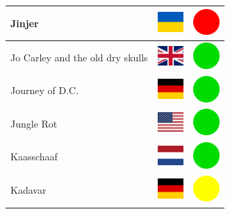 \documentclass[12pt, a4paper, twoside]{report}
\begin{document}
\begin{center}
\begin{longtable}{|p{5cm}|p{2cm}|p{2cm}|}
 Jinjer                                                     & \includegraphics[width=1cm]{../4x3/ua} &   \includegraphics[width=1cm]{../likes/n} \\ \hline
 Jo Carley and the old dry skulls                           & \includegraphics[width=1cm]{../4x3/gb} &   \includegraphics[width=1cm]{../likes/y} \\ \hline
 Journey of D.C.                                            & \includegraphics[width=1cm]{../4x3/de} &   \includegraphics[width=1cm]{../likes/y} \\ \hline
 Jungle Rot                                                 & \includegraphics[width=1cm]{../4x3/us} &   \includegraphics[width=1cm]{../likes/y} \\ \hline
 Kaasschaaf                                                 & \includegraphics[width=1cm]{../4x3/nl} &   \includegraphics[width=1cm]{../likes/y} \\ \hline
 Kadavar                                                    & \includegraphics[width=1cm]{../4x3/de} &   \includegraphics[width=1cm]{../likes/m} \\ \hline

\end{longtable}
\end{center}
\end{document}
